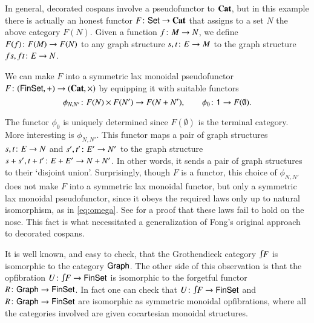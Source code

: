 \documentclass[reqno]{amsart}
\begin{document}
In general, decorated cospans involve a pseudofunctor to $\mathbf{Cat}$, but in this example there is actually an honest functor $F \colon \mathsf{Set} \to \mathbf{Cat}$ that assigns to a set $N$ the above category $F(N)$.   Given a function $f \colon M \to N$, we define $F(f) \colon F(M) \to F(N)$ to any graph structure $s,t \colon E \to M$ to the graph structure $f s, f t \colon E \to N$.   

We can make $F$ into a symmetric lax monoidal pseudofunctor $F \colon (\mathsf{Fin}\mathsf{Set}, +) \to (\mathbf{Cat},\times)$ by equipping it with suitable functors 
\[   \phi_{N,N'} \colon F(N) \times F(N') \to F(N+N'), \qquad \phi_0 \colon  \mathsf{1} \to F(\emptyset) . \]  

The functor $\phi_0$ is uniquely determined since $F(\emptyset)$ is the terminal category.   More interesting is $\phi_{N,N'}$.   This functor maps a pair of graph structures $s, t \colon E \to N$ and $s',t' \colon E' \to N'$ to the graph structure $s+s', t+t' \colon E+E' \to N+N'$.  In other words, it sends a pair of graph structures to their `disjoint union'.   Surprisingly, though $F$ is a functor, this choice of $\phi_{N,N'}$ does not make $F$ into a symmetric lax monoidal functor, but only a symmetric lax monoidal pseudofunctor, since it obeys the required laws only up to natural isomorphism, as in \cref{eq:omega}.   See \cite[Section 5]{BC} for a proof that these laws fail to hold on the nose.   This fact is what necessitated a generalization of Fong's original approach to decorated cospans.

It is well known, and easy to check, that the Grothendieck category $\inta F$ is isomorphic to the category $\mathsf{Graph}$.   The other side of this observation is that the opfibration $U \maps \inta F \to \Fin\Set$ is isomorphic to the forgetful functor $R \colon \mathsf{Graph} \to \mathsf{Fin}\mathsf{Set}$.    In fact one can check that $U \maps \inta F \to \Fin\Set$ and $R \colon \mathsf{Graph} \to \mathsf{Fin}\mathsf{Set}$ are isomorphic as symmetric monoidal opfibrations, where all the categories involved are given cocartesian monoidal structures.
\end{document}
